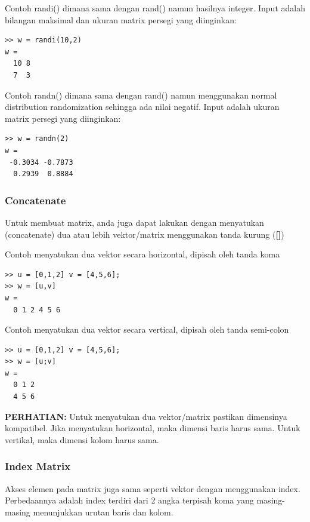 \documentclass[12pt]{book}
\begin{document}
\begin{itemize}
		Contoh randi() dimana sama dengan rand() namun hasilnya integer. Input adalah bilangan maksimal dan ukuran matrix persegi yang diinginkan:
		\newpage
		\begin{verbatim}
>> w = randi(10,2)
w =
  10 8
  7  3
	\end{verbatim}

	Contoh randn() dimana sama dengan rand() namun menggunakan normal distribution randomization sehingga ada nilai negatif.
	Input adalah ukuran matrix persegi yang diinginkan:
	\begin{verbatim}
>> w = randn(2)
w =
 -0.3034 -0.7873
  0.2939  0.8884
	\end{verbatim}

	\end{itemize}
	
	\subsubsection{Concatenate}
	
	Untuk membuat matrix, anda juga dapat lakukan dengan menyatukan (concatenate) dua atau lebih vektor/matrix menggunakan tanda kurung (\textbf{[]})
	
	Contoh menyatukan dua vektor secara horizontal, dipisah oleh tanda koma
	\begin{verbatim}
>> u = [0,1,2] v = [4,5,6];
>> w = [u,v]
w =
  0 1 2 4 5 6
	\end{verbatim}

	Contoh menyatukan dua vektor secara vertical, dipisah oleh tanda semi-colon
	\begin{verbatim}
>> u = [0,1,2] v = [4,5,6];
>> w = [u;v]
w =
  0 1 2
  4 5 6
	\end{verbatim}

	\textbf{PERHATIAN:} Untuk menyatukan dua vektor/matrix pastikan dimensinya kompatibel.
	Jika menyatukan horizontal, maka dimensi baris harus sama.
	Untuk vertikal, maka dimensi kolom harus sama.
	\subsubsection{Index Matrix}
	
	Akses elemen pada matrix juga sama seperti vektor dengan menggunakan index.
	Perbedaannya adalah index terdiri dari 2 angka terpisah koma yang masing-masing menunjukkan urutan baris dan kolom.
	
\end{document}
